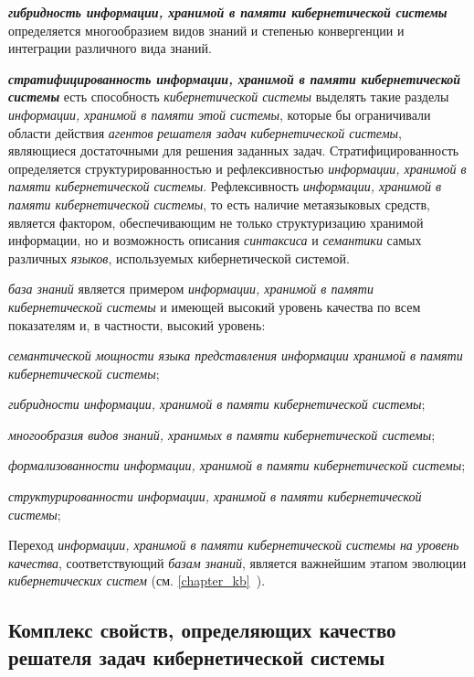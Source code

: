 \textbf{\textit{гибридность информации, хранимой в памяти кибернетической системы}} определяется многообразием видов знаний и степенью конвергенции и интеграции различного вида знаний.

\textbf{\textit{стратифицированность информации, хранимой в памяти кибернетической системы}} есть способность \textit{кибернетической системы} выделять такие разделы \textit{информации, хранимой в памяти этой системы}, которые бы ограничивали области действия \textit{агентов} \textit{решателя задач} \textit{кибернетической системы}, являющиеся достаточными для решения заданных задач.
Стратифицированность определяется структурированностью и рефлексивностью \textit{информации, хранимой в памяти кибернетической системы}.
Рефлексивность \textit{информации, хранимой в памяти кибернетической системы}, то есть наличие метаязыковых средств, является фактором, обеспечивающим не только структуризацию хранимой информации, но и возможность описания \textit{синтаксиса} и \textit{семантики} самых различных \textit{языков}, используемых кибернетической системой.

\textit{база знаний} является примером \textit{информации, хранимой в памяти кибернетической системы} и имеющей высокий уровень качества по всем показателям и, в частности, высокий уровень:
\begin{textitemize}
    \item \textit{семантической мощности языка представления информации хранимой в памяти кибернетической
системы};
    \item \textit{гибридности информации, хранимой в памяти кибернетической системы};
    \item \textit{многообразия видов знаний, хранимых в памяти кибернетической системы};
    \item \textit{формализованности информации, хранимой в памяти кибернетической системы};
    \item \textit{структурированности информации, хранимой в памяти кибернетической системы};
\end{textitemize}

Переход \textit{информации, хранимой в памяти кибернетической системы на уровень качества}, соответствующий \textit{базам знаний}, является важнейшим этапом эволюции \textit{кибернетических систем} (см. \ref{chapter_kb}~).

\subsection{Комплекс свойств, определяющих качество решателя задач кибернетической системы}
{\label{sec_cyb_syst_problem_solver_quality}} 

